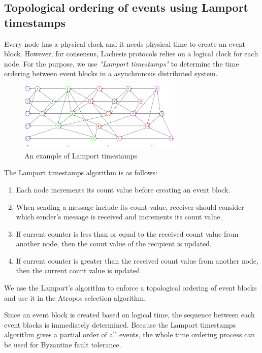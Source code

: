 \documentclass{article}
\begin{document}
\subsection{Topological ordering of events using Lamport timestamps}
Every node has a physical clock and it needs physical time to create an event block. However, for consensus, Lachesis protocols relies on a logical clock for each node. For the purpose, we use \textit{"Lamport timestamps"} \cite{lamport1978time} to determine the time ordering between event blocks in a asynchronous distributed system.


\begin{figure} \centering  
	\includegraphics[width=0.7\textwidth, width=1.0\columnwidth]{Lamport_timestamps.pdf}
	\caption{An example of Lamport timestamps}
	\label{fig:Lamport}
\end{figure}

\newpage

The Lamport timestamps algorithm is as follows:

\begin{enumerate}
\item Each node increments its count value before creating an event block.
\item When sending a message include its count value, receiver should consider which sender’s message is received and increments its count value.
\item If current counter is less than or equal to the received count value from another node, then the count value of the recipient is updated.  
\item If current counter is greater than the received count value from another node, then the current count value is updated.
\end{enumerate}


We use the Lamport's algorithm to enforce a topological ordering of event blocks and use it in the Atropos selection algorithm. 

Since an event block is created based on logical time, the sequence between each event blocks is immediately determined. Because the Lamport timestamps algorithm gives a partial order of all events, the whole time ordering process can be used for Byzantine fault tolerance.
\end{document}
